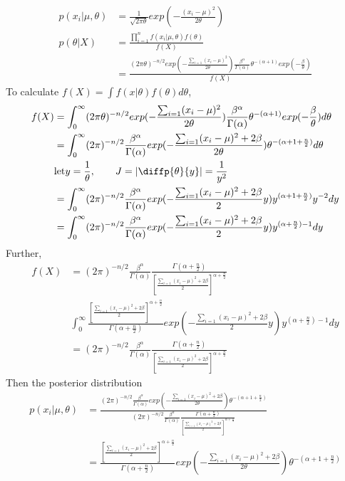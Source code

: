 \documentclass[11pt]{article} %
\begin{document}
\begin{itemize}
	\begin{align*}
		p(x_i|\mu, \theta) &= \frac{1}{\sqrt{2 \pi \theta}} exp(- \frac{(x_i-\mu)^2}{2 \theta} )\\
		p(\theta|X) &= \frac{\prod_{i=1}^n f(x_i| \mu, \theta) f(\theta)}{f(X)} \\
		&= \frac{ (2\pi \theta)^{-n/2} exp(-\frac{\sum_{i=1} (x_i-\mu)^2}{2\theta}) \frac{\beta^{\alpha}}{\Gamma(\alpha)} \theta^{-(\alpha + 1)} exp(-\frac{\beta}{\theta}) }{f(X)} 
	\end{align*} 
To calculate $f(X)= \int f(x|\theta) f(\theta) d \theta$,
\begin{align*}
	f(X)&=  \int_{0}^{\infty} (2\pi \theta)^{-n/2} exp(-\frac{\sum_{i=1} (x_i-\mu)^2}{2\theta}) \frac{\beta^{\alpha}}{\Gamma(\alpha)} \theta^{-(\alpha + 1)} exp(-\frac{\beta}{\theta}) d \theta \\	
	&= \int_{0}^{\infty} (2\pi )^{-n/2} \frac{\beta^{\alpha}}{\Gamma(\alpha)}  exp(-\frac{\sum_{i=1} (x_i-\mu)^2 + 2 \beta}{2\theta}) \theta^{-(\alpha + 1 + \frac{n}{2})}  d \theta \\	
	& \text{let} y= \frac{1}{\theta}, \qquad J=|\diffp{\theta}{y}| = \frac{1}{y^2} \\
	&= \int_{0}^{\infty} (2\pi )^{-n/2} \frac{\beta^{\alpha}}{\Gamma(\alpha)}  exp(-\frac{\sum_{i=1} (x_i-\mu)^2 + 2 \beta}{2} y) y^{(\alpha + 1 + \frac{n}{2})} y^{-2} d y \\	
	&= \int_{0}^{\infty} (2\pi )^{-n/2} \frac{\beta^{\alpha}}{\Gamma(\alpha)}  exp(-\frac{\sum_{i=1} (x_i-\mu)^2 + 2 \beta}{2} y) y^{(\alpha + \frac{n}{2})-1}  d y 
\end{align*} 
Further,
\begin{align*}
	f(X) &= (2\pi )^{-n/2}  \frac{\beta^{\alpha}}{\Gamma(\alpha)} \frac{\Gamma(\alpha + \frac{n}{2})}{[\frac{\sum_{i=1} (x_i-\mu)^2 + 2 \beta}{2}]^{\alpha + \frac{n}{2}}}\\
	& \int_{0}^{\infty} \frac{[\frac{\sum_{i=1} (x_i-\mu)^2 + 2 \beta}{2}]^{\alpha + \frac{n}{2}}}{\Gamma(\alpha + \frac{n}{2})} exp(-\frac{\sum_{i=1} (x_i-\mu)^2 + 2 \beta}{2} y) y^{(\alpha + \frac{n}{2})-1}  d y \\	
	&=  (2\pi )^{-n/2}  \frac{\beta^{\alpha}}{\Gamma(\alpha)} \frac{\Gamma(\alpha + \frac{n}{2})}{[\frac{\sum_{i=1} (x_i-\mu)^2 + 2 \beta}{2}]^{\alpha + \frac{n}{2}}}
\end{align*}
Then the posterior distribution
\begin{align*}
	p(x_i|\mu, \theta) &=  \frac{ (2\pi )^{-n/2} \frac{\beta^{\alpha}}{\Gamma(\alpha)}  exp(-\frac{\sum_{i=1} (x_i-\mu)^2 + 2 \beta}{2\theta}) \theta^{-(\alpha + 1 + \frac{n}{2})}   }{(2\pi )^{-n/2}  \frac{\beta^{\alpha}}{\Gamma(\alpha)} \frac{\Gamma(\alpha + \frac{n}{2})}{[\frac{\sum_{i=1} (x_i-\mu)^2 + 2 \beta}{2}]^{\alpha + \frac{n}{2}}}} \\
	&= \frac{[\frac{\sum_{i=1} (x_i-\mu)^2 + 2 \beta}{2}]^{\alpha + \frac{n}{2}}}{\Gamma(\alpha + \frac{n}{2})} exp(-\frac{\sum_{i=1} (x_i-\mu)^2 + 2 \beta}{2\theta}) \theta^{-(\alpha + 1 + \frac{n}{2})}
\end{align*} 


\end{itemize}
\end{document}
